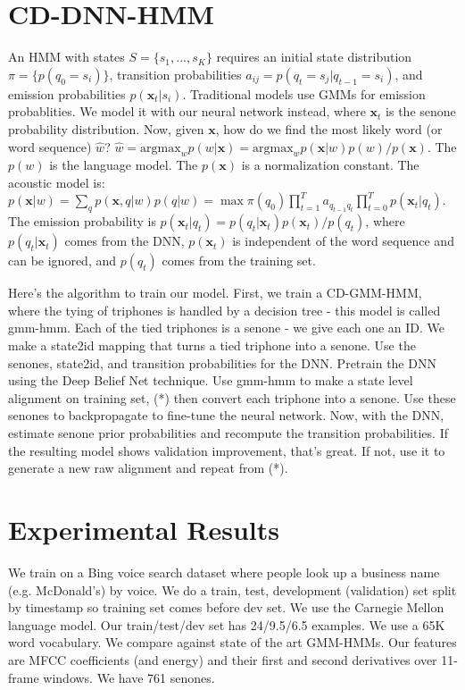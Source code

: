\documentclass[a4paper]{article}
\begin{document}
\section{CD-DNN-HMM}
An HMM with states $S = \{s_1, ..., s_K\}$ requires an initial state 
distribution $\pi = \{p(q_0 = s_i)\}$, transition probabilities $a_{ij} =
p(q_t = s_j | q_{t-1} = s_i)$, and emission probabilities
$p(\mathbf{x}_t | s_i)$. Traditional models use GMMs for emission probablities.
We model it with our neural network instead, where $\mathbf{x}_t$ is the senone
probability distribution. Now, given $\mathbf{x}$, how do we find the most
likely word (or word sequence) $\hat{w}$? $\hat{w} = \text{argmax}_{w}{p(
w | \mathbf{x}) = \text{argmax}_{w}{p(\mathbf{x}|w)p(w)/p(\mathbf{x})}}$.
The $p(w)$ is the language model. The $p(\mathbf{x})$ is a normalization 
constant. The acoustic model is: $p(\mathbf{x}|w) =
\sum_{q}{p(\mathbf{x}, q | w)p(q|w)} = \max{\pi(q_0) \prod_{t=1}^{T}{
a_{q_{t-1} q_t} \prod_{t=0}^{T}{p(\mathbf{x}_t | q_t)} }}$. The emission
probability is $p(\mathbf{x}_t | q_t) = p(q_t | \mathbf{x}_t) p(\mathbf{x}_t)
/ p(q_t)$, where $p(q_t | \mathbf{x}_t)$ comes from the DNN, $p(\mathbf{x}_t)$
is independent of the word sequence and can be ignored, and $p(q_t)$ comes from
the training set.

Here's the algorithm to train our model. First, we train a CD-GMM-HMM, where
the tying of triphones is handled by a decision tree - this model is called
gmm-hmm. Each of the tied triphones is a senone - we give each one an ID. We
make a state2id mapping that turns a tied triphone into a senone. Use the
senones, state2id, and transition probabilities for the DNN. Pretrain the
DNN using the Deep Belief Net technique. Use gmm-hmm to make a state
level alignment on training set, (*) then convert each triphone into a senone.
Use these senones to backpropagate to fine-tune the neural network. Now,
with the DNN, estimate senone prior probabilities and recompute the
transition probabilities. If the resulting model shows validation improvement,
that's great. If not, use it to generate a new raw alignment and repeat from
(*).

\section{Experimental Results}
We train on a Bing voice search dataset where people look up a business name
(e.g. McDonald's) by voice. We do a train, test, development 
(validation) set split by timestamp so training set comes before dev set.
We use the Carnegie Mellon language model. Our train/test/dev set has 24/9.5/6.5
examples. We use a 65K word vocabulary. We compare against state of
the art GMM-HMMs. Our features are MFCC coefficients (and energy) and their
first and second derivatives over 11-frame windows. We have 761 senones.
\end{document}

